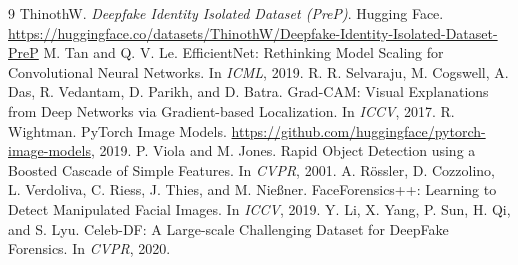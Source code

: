 \documentclass[11pt]{article}
\begin{document}
\begin{thebibliography}{9}\small
{} ThinothW. \textit{Deepfake Identity Isolated Dataset (PreP)}. Hugging Face. \url{https://huggingface.co/datasets/ThinothW/Deepfake-Identity-Isolated-Dataset-PreP}
 M. Tan and Q. V. Le. EfficientNet: Rethinking Model Scaling for Convolutional Neural Networks. In \textit{ICML}, 2019.
 R. R. Selvaraju, M. Cogswell, A. Das, R. Vedantam, D. Parikh, and D. Batra. Grad-CAM: Visual Explanations from Deep Networks via Gradient-based Localization. In \textit{ICCV}, 2017.
 R. Wightman. PyTorch Image Models. \url{https://github.com/huggingface/pytorch-image-models}, 2019.
 P. Viola and M. Jones. Rapid Object Detection using a Boosted Cascade of Simple Features. In \textit{CVPR}, 2001.
 A. R\"ossler, D. Cozzolino, L. Verdoliva, C. Riess, J. Thies, and M. Nie{\ss}ner. FaceForensics++: Learning to Detect Manipulated Facial Images. In \textit{ICCV}, 2019.
 Y. Li, X. Yang, P. Sun, H. Qi, and S. Lyu. Celeb-DF: A Large-scale Challenging Dataset for DeepFake Forensics. In \textit{CVPR}, 2020.
\end{thebibliography}
\end{document}
